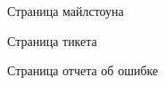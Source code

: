	\begin{figure}[h]
		\caption{Страница майлстоуна}
		\label{fig:milestonePage}
	\end{figure}
	\begin{figure}[h]
		\caption{Страница тикета}
		\label{fig:ticketPage}
	\end{figure}
	\begin{figure}[h]
		\caption{Страница отчета об ошибке}
		\label{fig:reportPage}
	\end{figure}